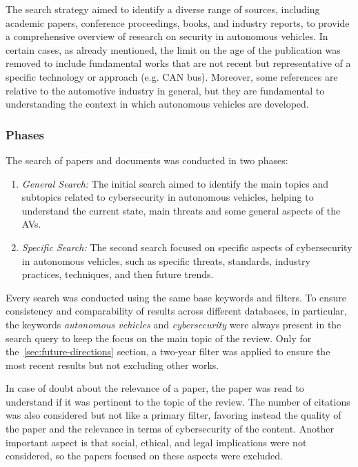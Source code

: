 The search strategy aimed to identify a diverse range of sources, including academic papers, conference proceedings, books, and industry reports, to provide a comprehensive overview of research on security in autonomous vehicles.
In certain cases, as already mentioned, the limit on the age of the publication was removed to include fundamental works that are not recent but representative of a specific technology or approach (e.g. CAN bus).
Moreover, some references are relative to the automotive industry in general, but they are fundamental to understanding the context in which autonomous vehicles are developed.

\subsubsection{Phases}\label{subsubsec:phases}
The search of papers and documents was conducted in two phases:
\begin{enumerate}
    \item \textit{General Search:} The initial search aimed to identify the main topics and subtopics related to cybersecurity in autonomous vehicles, helping to understand the current state, main threats and some general aspects of the AVs.
    \item \textit{Specific Search:} The second search focused on specific aspects of cybersecurity in autonomous vehicles, such as specific threats, standards, industry practices, techniques, and then future trends.
\end{enumerate}

Every search was conducted using the same base keywords and filters.
To ensure consistency and comparability of results across different databases, in particular, the keywords \textit{autonomous vehicles} and \textit{cybersecurity} were always present in the search query to keep the focus on the main topic of the review.
Only for the~\ref{sec:future-directions} section, a two-year filter was applied to ensure the most recent results but not excluding other works.

In case of doubt about the relevance of a paper, the paper was read to understand if it was pertinent to the topic of the review.
The number of citations was also considered but not like a primary filter, favoring instead the quality of the paper and the relevance in terms of cybersecurity of the content.
Another important aspect is that social, ethical, and legal implications were not considered, so the papers focused on these aspects were excluded.


